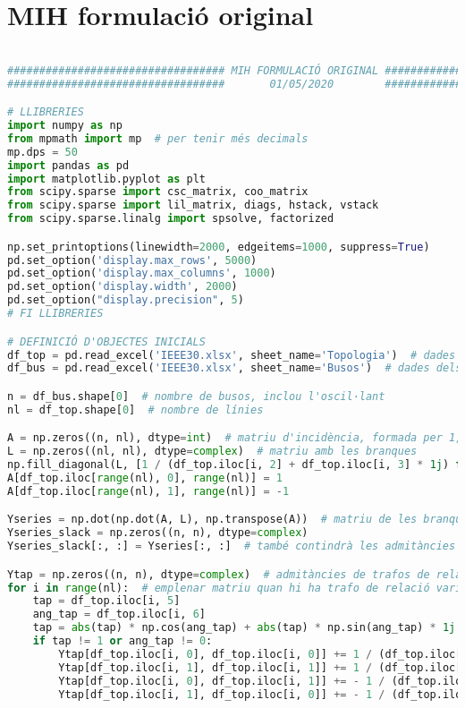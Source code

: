 \section{MIH formulació original}
\begin{lstlisting}[language=Python,numbers=none]

################################## MIH FORMULACIÓ ORIGINAL ###################################
##################################       01/05/2020        ###################################

# LLIBRERIES
import numpy as np
from mpmath import mp  # per tenir més decimals
mp.dps = 50
import pandas as pd
import matplotlib.pyplot as plt
from scipy.sparse import csc_matrix, coo_matrix
from scipy.sparse import lil_matrix, diags, hstack, vstack
from scipy.sparse.linalg import spsolve, factorized

np.set_printoptions(linewidth=2000, edgeitems=1000, suppress=True)
pd.set_option('display.max_rows', 5000)
pd.set_option('display.max_columns', 1000)
pd.set_option('display.width', 2000)
pd.set_option("display.precision", 5)
# FI LLIBRERIES

# DEFINICIÓ D'OBJECTES INICIALS
df_top = pd.read_excel('IEEE30.xlsx', sheet_name='Topologia')  # dades de la topologia
df_bus = pd.read_excel('IEEE30.xlsx', sheet_name='Busos')  # dades dels busos

n = df_bus.shape[0]  # nombre de busos, inclou l'oscil·lant
nl = df_top.shape[0]  # nombre de línies

A = np.zeros((n, nl), dtype=int)  # matriu d'incidència, formada per 1, -1 i 0
L = np.zeros((nl, nl), dtype=complex)  # matriu amb les branques
np.fill_diagonal(L, [1 / (df_top.iloc[i, 2] + df_top.iloc[i, 3] * 1j) for i in range(nl)])
A[df_top.iloc[range(nl), 0], range(nl)] = 1
A[df_top.iloc[range(nl), 1], range(nl)] = -1

Yseries = np.dot(np.dot(A, L), np.transpose(A))  # matriu de les branques sèrie, es reduirà
Yseries_slack = np.zeros((n, n), dtype=complex)
Yseries_slack[:, :] = Yseries[:, :]  # també contindrà les admitàncies amb el bus oscil·lant

Ytap = np.zeros((n, n), dtype=complex)  # admitàncies de trafos de relació variable
for i in range(nl):  # emplenar matriu quan hi ha trafo de relació variable
    tap = df_top.iloc[i, 5]
    ang_tap = df_top.iloc[i, 6]
    tap = abs(tap) * np.cos(ang_tap) + abs(tap) * np.sin(ang_tap) * 1j
    if tap != 1 or ang_tap != 0:
        Ytap[df_top.iloc[i, 0], df_top.iloc[i, 0]] += 1 / (df_top.iloc[i, 2] + df_top.iloc[i, 3] * 1j) / (tap * np.conj(tap)) - 1 / (df_top.iloc[i, 2] + df_top.iloc[i, 3] * 1j)
        Ytap[df_top.iloc[i, 1], df_top.iloc[i, 1]] += 1 / (df_top.iloc[i, 2] + df_top.iloc[i, 3] * 1j) - 1 / (df_top.iloc[i, 2] + df_top.iloc[i, 3] * 1j)
        Ytap[df_top.iloc[i, 0], df_top.iloc[i, 1]] += - 1 / (df_top.iloc[i, 2] + df_top.iloc[i, 3] * 1j) / (np.conj(tap)) + 1 / (df_top.iloc[i, 2] + df_top.iloc[i, 3] * 1j)
        Ytap[df_top.iloc[i, 1], df_top.iloc[i, 0]] += - 1 / (df_top.iloc[i, 2] + df_top.iloc[i, 3] * 1j) / (tap) + 1 / (df_top.iloc[i, 2] + df_top.iloc[i, 3] * 1j)


\end{lstlisting}
